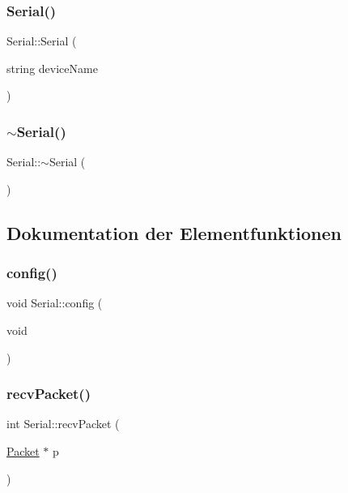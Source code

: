 \subsubsection{\texorpdfstring{Serial()}{Serial()}}
{\footnotesize\ttfamily Serial\+::\+Serial (\begin{DoxyParamCaption}\item[{string}]{device\+Name }\end{DoxyParamCaption})}

\hypertarget{class_serial_a5b32c394c0ff923a4ef1c13cfb20a6ba}{}\label{class_serial_a5b32c394c0ff923a4ef1c13cfb20a6ba} 
\subsubsection{\texorpdfstring{$\sim$\+Serial()}{~Serial()}}
{\footnotesize\ttfamily Serial\+::$\sim$\+Serial (\begin{DoxyParamCaption}{ }\end{DoxyParamCaption})}



\subsection{Dokumentation der Elementfunktionen}
\hypertarget{class_serial_a50aa90466c7c87af0178cfd496da36be}{}\label{class_serial_a50aa90466c7c87af0178cfd496da36be} 
\subsubsection{\texorpdfstring{config()}{config()}}
{\footnotesize\ttfamily void Serial\+::config (\begin{DoxyParamCaption}\item[{void}]{ }\end{DoxyParamCaption})}

\hypertarget{class_serial_a357fce40e93f5a3700bfec09defd0bf9}{}\label{class_serial_a357fce40e93f5a3700bfec09defd0bf9} 
\subsubsection{\texorpdfstring{recv\+Packet()}{recvPacket()}}
{\footnotesize\ttfamily int Serial\+::recv\+Packet (\begin{DoxyParamCaption}\item[{\hyperlink{struct_packet}{Packet} $\ast$}]{p }\end{DoxyParamCaption})}

